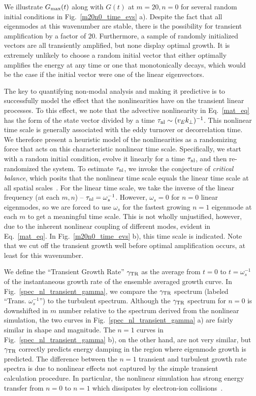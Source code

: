 \documentclass[letter,scriptaddress,twocolumn, prl,showkeys]{revtex4}
\begin{document}
We illustrate $G_{\rm{max}}(t)$ along with $G(t)$ at $m=20, n=0$ for several random initial conditions in Fig.~\ref{m20n0_time_evs} a). Despite the fact that all eigenmodes at this
wavenumber are stable, there is the possibility for transient amplification by a factor of $20$. Furthermore, a sample of randomly initialized vectors are all transiently amplified, but none display
optimal growth. It is extremely unlikely to choose a random initial vector that either optimally amplifies the energy at any time or one that monotonically decays, which would be the case
if the initial vector were one of the linear eigenvectors. 

The key to quantifying non-modal analysis and making it predictive is to successfully model the effect that the nonlinearities have on the transient linear processes. 
To this effect, we note that the advective nonlinearity in Eq.~\ref{mat_eq} has the form of the state vector divided by a time $\tau_{\rm{nl}} \sim (v_E k_\perp)^{-1}$. This nonlinear
time scale is generally associated with the eddy turnover or decorrelation time. We therefore present a heuristic model of the nonlinearities 
as a randomizing force that acts on this characteristic nonlinear time scale.
Specifically, we start with a random initial condition, evolve it linearly for a time $\tau_{\rm{nl}}$, and then re-randomized the system.
To estimate $\tau_{\rm{nl}}$, we invoke the conjecture of \emph{critical balance}, which posits that the nonlinear time scale equals the linear time scale at all spatial scales~\cite{schekochihin2012}. 
For the linear time scale, we take the inverse of the linear frequency (at each $m,n$) -- $\tau_{\rm{nl}} = \omega_s^{-1}$.
However, $\omega_s = 0$ for $n=0$ linear eigenmodes, so we are forced to use $\omega_s$ for the fastest growing $n=1$ eigenmode at each $m$ to get a meaningful time scale. This is not wholly
unjustified, however, due to the inherent nonlinear coupling of different modes, evident in Eq.~\ref{mat_eq}.
In Fig.~\ref{m20n0_time_evs} b), this time scale is indicated. Note that we cut off the transient growth well before optimal amplification occurs, at least for this wavenumber.

We define the ``Transient Growth Rate'' $\gamma_{\rm{TR}}$ as the average from $t=0$ to $t=\omega_s^{-1}$ of the instantaneous growth rate of the ensemble averaged growth curve.
In Fig.~\ref{spec_nl_transient_gamma}, we compare the $\gamma_{\rm{TR}}$ spectrum (labeled ``Trans. $\omega_s^{-1}$'') to the turbulent spectrum.
Although the $\gamma_{\rm{TR}}$ spectrum for $n=0$ is downshifted in $m$ number relative to the spectrum derived from the nonlinear simulation, the two curves in Fig.~\ref{spec_nl_transient_gamma} a)
are fairly similar in shape and magnitude.
The $n=1$ curves in Fig.~\ref{spec_nl_transient_gamma} b), on the other hand, are not very similar, but $\gamma_{\rm{TR}}$ correctly predicts energy damping in the region where
eigenmode growth is predicted.
The difference between the $n=1$ transient and turbulent growth rate spectra is due to nonlinear effects not captured by the simple transient calculation procedure. In particular, the nonlinear
simulation has strong energy transfer from $n=0$ to $n=1$ which dissipates by electron-ion collisions~\cite{friedman2012b}. 
\end{document}
